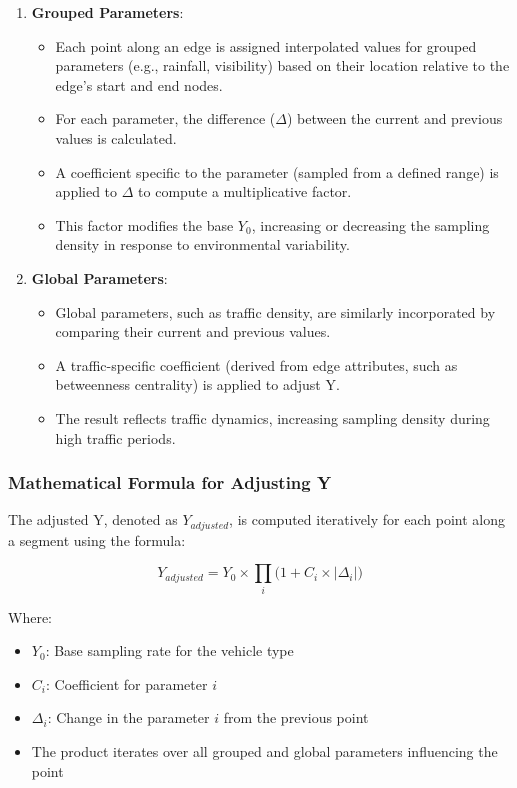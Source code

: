 \documentclass[sigplan,screen]{acmart}
\begin{document}
\begin{enumerate}
    \item \textbf{Grouped Parameters}:
    \begin{itemize}
        \item Each point along an edge is assigned interpolated values for grouped parameters (e.g., rainfall, visibility) based on their location relative to the edge's start and end nodes.
        \item For each parameter, the difference ($\Delta$) between the current and previous values is calculated.
        \item A coefficient specific to the parameter (sampled from a defined range) is applied to $\Delta$ to compute a multiplicative factor.
        \item This factor modifies the base $Y_0$, increasing or decreasing the sampling density in response to environmental variability.
    \end{itemize}

    \item \textbf{Global Parameters}:
    \begin{itemize}
        \item Global parameters, such as traffic density, are similarly incorporated by comparing their current and previous values.
        \item A traffic-specific coefficient (derived from edge attributes, such as betweenness centrality) is applied to adjust Y.
        \item The result reflects traffic dynamics, increasing sampling density during high traffic periods.
    \end{itemize}
\end{enumerate}

\subsubsection{Mathematical Formula for Adjusting Y}
The adjusted Y, denoted as $Y_{adjusted}$, is computed iteratively for each point along a segment using the formula:

\[
Y_{adjusted} = Y_0 \times \prod_{i} \big( 1 + C_i \times |\Delta_i| \big)
\]

Where:
\begin{itemize}
    \item $Y_0$: Base sampling rate for the vehicle type
    \item $C_i$: Coefficient for parameter $i$
    \item $\Delta_i$: Change in the parameter $i$ from the previous point
    \item The product iterates over all grouped and global parameters influencing the point
\end{itemize}
\end{document}
